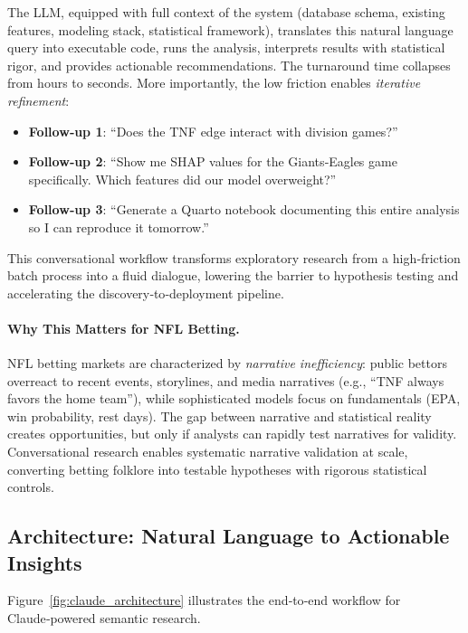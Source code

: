 The LLM, equipped with full context of the system (database schema, existing features, modeling stack, statistical framework), translates this natural language query into executable code, runs the analysis, interprets results with statistical rigor, and provides actionable recommendations. The turnaround time collapses from hours to seconds. More importantly, the low friction enables \textit{iterative refinement}:
\begin{itemize}
\item \textbf{Follow‑up 1}: ``Does the TNF edge interact with division games?''
\item \textbf{Follow‑up 2}: ``Show me SHAP values for the Giants‑Eagles game specifically. Which features did our model overweight?''
\item \textbf{Follow‑up 3}: ``Generate a Quarto notebook documenting this entire analysis so I can reproduce it tomorrow.''
\end{itemize}

This conversational workflow transforms exploratory research from a high‑friction batch process into a fluid dialogue, lowering the barrier to hypothesis testing and accelerating the discovery‑to‑deployment pipeline.

\paragraph{Why This Matters for NFL Betting.}
NFL betting markets are characterized by \textit{narrative inefficiency}: public bettors overreact to recent events, storylines, and media narratives (e.g., ``TNF always favors the home team''), while sophisticated models focus on fundamentals (EPA, win probability, rest days). The gap between narrative and statistical reality creates opportunities, but only if analysts can rapidly test narratives for validity. Conversational research enables systematic narrative validation at scale, converting betting folklore into testable hypotheses with rigorous statistical controls.

\subsection{Architecture: Natural Language to Actionable Insights}
\label{subsec:architecture_claude}

Figure~\ref{fig:claude_architecture} illustrates the end‑to‑end workflow for Claude‑powered semantic research.

